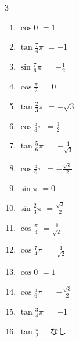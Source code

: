 \begin{multicols}{3}
\begin{enumerate}
  \item $\displaystyle \cos{0}$
        $\displaystyle =1$

  \item $\displaystyle \tan{\frac{7}{4}\pi}$
        $\displaystyle =-1$

  \item $\displaystyle \sin{\frac{7}{6}\pi}$
        $\displaystyle =-\frac{1}{2}$

  \item $\displaystyle \cos{\frac{\pi}{2}}$
        $\displaystyle =0$

  \item $\displaystyle \tan{\frac{2}{3}\pi}$
        $\displaystyle =-\sqrt{3}$

  \item $\displaystyle \cos{\frac{5}{3}\pi}$
        $\displaystyle =\frac{1}{2}$

  \item $\displaystyle \tan{\frac{5}{6}\pi}$
        $\displaystyle =-\frac{1}{\sqrt{3}}$

  \item $\displaystyle \cos{\frac{5}{6}\pi}$
        $\displaystyle =-\frac{\sqrt{3}}{2}$

\columnbreak %

  \item $\displaystyle \sin{\pi}$
        $\displaystyle =0$

  \item $\displaystyle \sin{\frac{2}{3}\pi}$
        $\displaystyle =\frac{\sqrt{3}}{2}$

  \item $\displaystyle \cos{\frac{\pi}{4}}$
        $\displaystyle =\frac{1}{\sqrt{2}}$

  \item $\displaystyle \cos{\frac{7}{4}\pi}$
        $\displaystyle =\frac{1}{\sqrt{2}}$

  \item $\displaystyle \cos{0}$
        $\displaystyle =1$

  \item $\displaystyle \cos{\frac{5}{6}\pi}$
        $\displaystyle =-\frac{\sqrt{3}}{2}$

  \item $\displaystyle \tan{\frac{3}{4}\pi}$
        $\displaystyle =-1$

  \item $\displaystyle \tan{\frac{\pi}{2}}$
        $\displaystyle \quad なし$


\end{enumerate}
\end{multicols}

